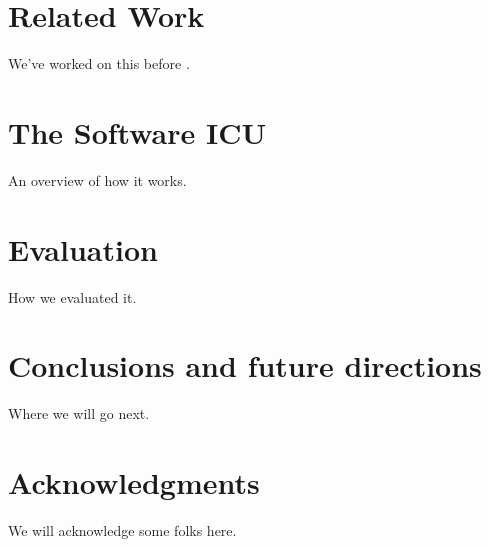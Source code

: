 \documentclass{acm_proc_article-sp}
\begin{document}
\section {Related Work}

We've worked on this before \cite{csdl2-07-02,csdl2-03-12,csdl2-03-13}.

\section{The Software ICU}

An overview of how it works.  

\section{Evaluation}

How we evaluated it.

\section{Conclusions and future directions}

Where we will go next.

\section{Acknowledgments}

We will acknowledge some folks here.


  
\end{document}
